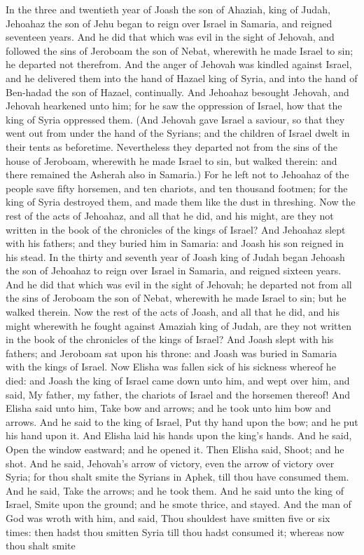 In the three and twentieth year of Joash the son of Ahaziah, king of Judah, Jehoahaz the son of Jehu began to reign over Israel in Samaria, and reigned seventeen years. And he did that which was evil in the sight of Jehovah, and followed the sins of Jeroboam the son of Nebat, wherewith he made Israel to sin; he departed not therefrom. And the anger of Jehovah was kindled against Israel, and he delivered them into the hand of Hazael king of Syria, and into the hand of Ben-hadad the son of Hazael, continually. And Jehoahaz besought Jehovah, and Jehovah hearkened unto him; for he saw the oppression of Israel, how that the king of Syria oppressed them. (And Jehovah gave Israel a saviour, so that they went out from under the hand of the Syrians; and the children of Israel dwelt in their tents as beforetime. Nevertheless they departed not from the sins of the house of Jeroboam, wherewith he made Israel to sin, but walked therein: and there remained the Asherah also in Samaria.) For he left not to Jehoahaz of the people save fifty horsemen, and ten chariots, and ten thousand footmen; for the king of Syria destroyed them, and made them like the dust in threshing. Now the rest of the acts of Jehoahaz, and all that he did, and his might, are they not written in the book of the chronicles of the kings of Israel? And Jehoahaz slept with his fathers; and they buried him in Samaria: and Joash his son reigned in his stead.  In the thirty and seventh year of Joash king of Judah began Jehoash the son of Jehoahaz to reign over Israel in Samaria, and reigned sixteen years. And he did that which was evil in the sight of Jehovah; he departed not from all the sins of Jeroboam the son of Nebat, wherewith he made Israel to sin; but he walked therein. Now the rest of the acts of Joash, and all that he did, and his might wherewith he fought against Amaziah king of Judah, are they not written in the book of the chronicles of the kings of Israel? And Joash slept with his fathers; and Jeroboam sat upon his throne: and Joash was buried in Samaria with the kings of Israel.  Now Elisha was fallen sick of his sickness whereof he died: and Joash the king of Israel came down unto him, and wept over him, and said, My father, my father, the chariots of Israel and the horsemen thereof! And Elisha said unto him, Take bow and arrows; and he took unto him bow and arrows. And he said to the king of Israel, Put thy hand upon the bow; and he put his hand upon it. And Elisha laid his hands upon the king’s hands. And he said, Open the window eastward; and he opened it. Then Elisha said, Shoot; and he shot. And he said, Jehovah’s arrow of victory, even the arrow of victory over Syria; for thou shalt smite the Syrians in Aphek, till thou have consumed them. And he said, Take the arrows; and he took them. And he said unto the king of Israel, Smite upon the ground; and he smote thrice, and stayed. And the man of God was wroth with him, and said, Thou shouldest have smitten five or six times: then hadst thou smitten Syria till thou hadst consumed it; whereas now thou shalt smite 
